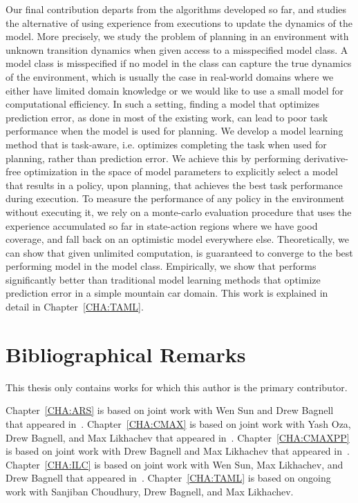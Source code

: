 Our final contribution departs from the algorithms developed so far, and studies
the alternative of using experience from executions to update the dynamics of
the model. More precisely, we study the problem of planning in an environment
with unknown transition dynamics when given access to a misspecified model
class. A model class is misspecified if no model in the class can capture the
true dynamics of the environment, which is usually the case in real-world
domains where we either have limited domain knowledge or we would like to use a
small model for computational efficiency. In such a setting, finding a model
that optimizes prediction error, as done in most of the existing work, can
lead to poor task performance when the model is used for planning. We develop a
model learning method \taml{} that is task-aware, i.e. optimizes completing the task
when used for planning, rather than prediction error. We achieve this
by performing derivative-free optimization in the space of model
parameters to explicitly select a model that 
results in a policy, upon planning, that achieves the best task performance
during execution. To measure the performance of any policy in the
environment without executing it, we rely on a monte-carlo evaluation procedure
that uses the experience accumulated so far in
state-action regions where we have good coverage, and fall back on an
optimistic model everywhere else. Theoretically, we can show that given
unlimited computation, \taml{} is guaranteed to converge to the best performing
model in the model class. Empirically, we show that \taml{} performs
significantly better than traditional model learning methods that optimize
prediction error in a simple mountain car domain. This work is explained in
detail in Chapter~\ref{CHA:TAML}.

\section{Bibliographical Remarks}
\label{sec:bibl-remarks}

This thesis only contains works for which this author is the primary
contributor.

Chapter~\ref{CHA:ARS} is based on joint work with Wen Sun and Drew Bagnell
that appeared in~\cite{aistats19}.
Chapter~\ref{CHA:CMAX} is based on joint work with Yash Oza, Drew Bagnell, and Max
Likhachev that appeared in~\cite{cmax}.
Chapter~\ref{CHA:CMAXPP} is based on joint work with Drew Bagnell and Max
Likhachev that appeared in~\cite{cmaxpp}.
Chapter~\ref{CHA:ILC} is based on joint work with Wen Sun, Max Likhachev,
and Drew Bagnell that appeared in~\cite{ilc}.
Chapter~\ref{CHA:TAML} is based on ongoing work with Sanjiban Choudhury, Drew
Bagnell, and Max Likhachev.

